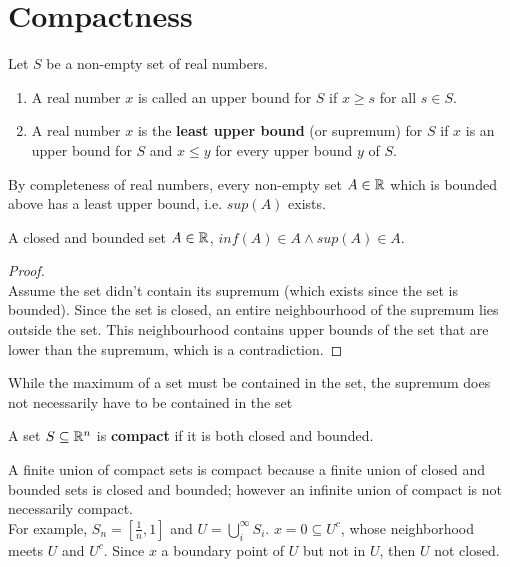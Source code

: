 \documentclass[11pt]{article}
\begin{document}
\section{Compactness}

\begin{defn}
  \label{least upper bound}
  Let $S$ be a non-empty set of real numbers.
  \begin{enumerate}
    \item A real number $x$ is called an upper bound for $S$ if $x \geq s$ for all $s \in S$.
    \item A real number $x$ is the \textbf{least upper bound} (or supremum) for $S$ if $x$ is an upper bound for $S$ and $x \leq y$ for every upper bound $y$ of $S$.
  \end{enumerate}

  \begin{theorem}
    \label{complete axioms}
     By completeness of real numbers, every non-empty set $A\in \mathbb{R}$ which is bounded above has a least upper bound, i.e. $sup(A)$ exists.
  \end{theorem}

  \begin{defn}
    A closed and bounded set $A \in\mathbb{R}$, $inf(A)\in A \land sup(A)\in A$.
    \begin{proof}
      $ $\\
      Assume the set didn't contain its supremum (which exists since the set is bounded). Since the set is closed, an entire neighbourhood of the supremum lies outside the set. This neighbourhood contains upper bounds of the set that are lower than the supremum, which is a contradiction.
    \end{proof}
  \end{defn}
  \begin{note}
    While the maximum of a set must be contained in the set, the supremum does not necessarily have to be contained in the set
  \end{note}
\end{defn}


\begin{defn}
  \label{compactness}
  A set $S\subseteq \mathbb{R}^n$ is \textbf{compact} if it is both closed and bounded.

  \begin{theorem}
    A finite union of compact sets is compact because a finite union of closed and bounded sets is closed and bounded; however an infinite union of compact is not necessarily compact. \\
    For example, $S_n = [\frac{1}{n}, 1]$ and $U=\bigcup_i^{\infty}{S_i}$. $x = 0\subseteq U^c$, whose neighborhood meets $U$ and $U^c$. Since $x$ a boundary point of $U$ but not in $U$, then $U$ not closed.
  \end{theorem}
\end{defn}
\end{document}

